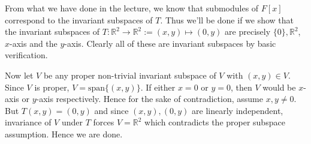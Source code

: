 \documentclass[12pt]{exam}
\theoremstyle{plain} %
\theoremstyle{definition} %
\theoremstyle{remark} %
\begin{document}
\begin{questions}
\begin{solution}
  \end{solution}

  \question
  \begin{solution}
    From what we have done in the lecture, we know that submodules of
    $F[x]$ correspond to the invariant subspaces of $T$. Thus we'll
    be done if we show that the invariant subspaces of $T :
    \mathbb{R}^2 \to \mathbb{R}^2 := (x, y) \mapsto (0, y)$ are
    precisely $\{ 0 \}, \mathbb{R}^2$, $x$-axis and the $y$-axis.
    Clearly all of these are invariant subspaces by basic verification.

    Now let $V$ be any proper non-trivial invariant subspace of $V$ with $(x, y)
    \in V$. Since $V$ is proper, $V = \textrm{span}\{ (x, y) \}$. If
    either $x = 0$ or
    $y = 0$, then $V$ would be $x$-axis or $y$-axis respectively.
    Hence for the sake of contradiction, assume $x, y \neq 0$. But
    $T(x, y) = (0, y)$ and since $(x, y), (0, y)$ are linearly
    independent, invariance of $V$ under $T$ forces $V =
    \mathbb{R}^2$ which contradicts the proper subspace assumption.
    Hence we are done.
  \end{solution}

\end{questions}
\printbibliography[heading=bibintoc]
\end{document}
